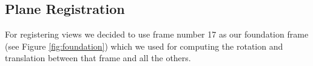 \subsection{Plane Registration}

For registering views we decided to use frame number 17 as our foundation frame (see Figure \ref{fig:foundation}) which we used for computing the rotation and translation between that frame and all the others.

